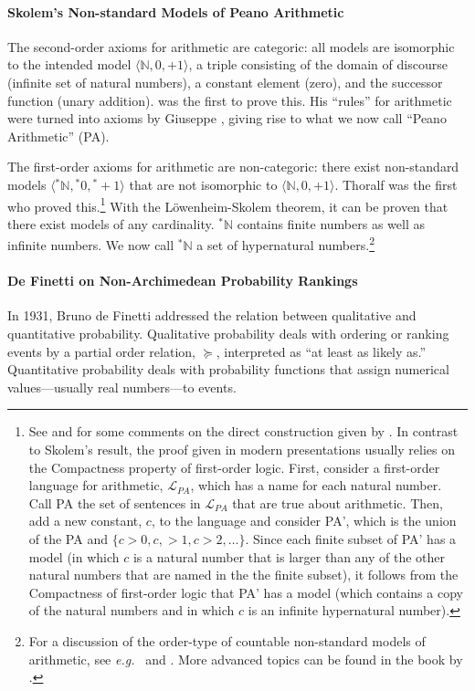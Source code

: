 \paragraph{Skolem's Non-standard Models of Peano Arithmetic}\label{sec:skolem}
The second-order axioms for arithmetic are categoric: all models are isomorphic to the intended model $\langle \mathbb{N},0,+1 \rangle$, a triple consisting of the domain of discourse (infinite set of natural numbers), a constant element (zero), and the successor function (unary addition).
\citet{Dedekind:1888} was the first to prove this. His ``rules'' for arithmetic were turned into axioms by Giuseppe \citet{Peano:1889}, giving rise to what we now call ``Peano Arithmetic'' (PA).

The first-order axioms for arithmetic are non-categoric: there exist non-standard models $\langle {^\ast\mathbb{N}},{^\ast0},{^\ast+}{1} \rangle$ that are not isomorphic to $\langle \mathbb{N},0,+1 \rangle$. Thoralf \citet{Skolem:1934} was the first who proved this.\footnote{See \citet[section~3]{Stillwell:1977} and \citet[section~3.2]{Kanovei_etal:2013} for some comments on the direct construction given by \citet{Skolem:1934}. In contrast to Skolem's result, the proof given in modern presentations usually relies on the Compactness property of first-order logic. First, consider a first-order language for arithmetic, $\mathcal{L}_{PA}$, which has a name for each natural number. Call PA the set of sentences in $\mathcal{L}_{PA}$ that are true about arithmetic. Then, add a new constant, $c$, to the language and consider PA', which is the union of the PA and $\{c>0,c,>1,c>2, \ldots\}$. Since each finite subset of PA' has a model (in which $c$ is a natural number that is larger than any of the other natural numbers that are named in the the finite subset), it follows from the Compactness of first-order logic that PA' has a model (which contains a copy of the natural numbers and in which $c$ is an infinite hypernatural number).\label{fn:Skolem}} With the L\"{o}wenheim-Skolem theorem, it can be proven that there exist models of any cardinality. ${^\ast\mathbb{N}}$ contains finite numbers as well as infinite numbers. We now call ${^\ast\mathbb{N}}$ a set of hypernatural numbers.\footnote{For a discussion of the order-type of countable non-standard models of arithmetic, see \textit{e.g.}\ \citet[Ch.~25, p.~302--318]{Boolos_etal:2007} and \citet{McGee:2002}. More advanced topics can be found in the book by \citet{KossakSchmerl:2006}.}

\paragraph{De Finetti on Non-Archimedean Probability Rankings\label{sec:dF}}
In 1931, Bru\-no de Finetti addressed the relation between qualitative and quantitative probability. Qualitative probability deals with ordering or ranking events by a partial order relation, $\succeq$, interpreted as ``at least as likely as.'' Quantitative probability deals with probability functions that assign numerical values---usually real numbers---to events.

